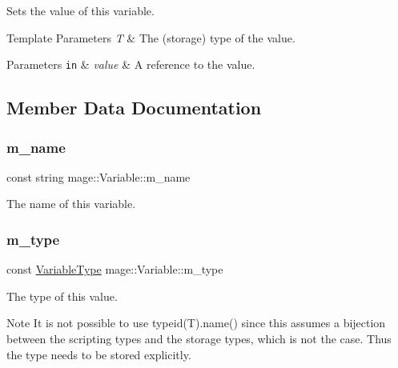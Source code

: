 Sets the value of this variable.


\begin{DoxyTemplParams}{Template Parameters}
{\em T} & The (storage) type of the value. \\
\hline
\end{DoxyTemplParams}

\begin{DoxyParams}[1]{Parameters}
\mbox{\tt in}  & {\em value} & A reference to the value. \\
\hline
\end{DoxyParams}


\subsection{Member Data Documentation}
\hypertarget{structmage_1_1_variable_afac262aa51bb1dfe447d501abcaa08d0}{}\label{structmage_1_1_variable_afac262aa51bb1dfe447d501abcaa08d0} 
\subsubsection{\texorpdfstring{m\+\_\+name}{m\_name}}
{\footnotesize\ttfamily const string mage\+::\+Variable\+::m\+\_\+name\hspace{0.3cm}{\ttfamily [private]}}

The name of this variable. \hypertarget{structmage_1_1_variable_acb45a61a0690e0efac614915595c4449}{}\label{structmage_1_1_variable_acb45a61a0690e0efac614915595c4449} 
\subsubsection{\texorpdfstring{m\+\_\+type}{m\_type}}
{\footnotesize\ttfamily const \hyperlink{namespacemage_a530428e73bac0ba7fe84b29086a9e33a}{Variable\+Type} mage\+::\+Variable\+::m\+\_\+type\hspace{0.3cm}{\ttfamily [private]}}

The type of this value.

\begin{DoxyNote}{Note}
It is not possible to use typeid(\+T).name() since this assumes a bijection between the scripting types and the storage types, which is not the case. Thus the type needs to be stored explicitly. 
\end{DoxyNote}
\hypertarget{structmage_1_1_variable_aa5cb27cab73d73715fe29fa6810d88bf}{}\label{structmage_1_1_variable_aa5cb27cab73d73715fe29fa6810d88bf} 

